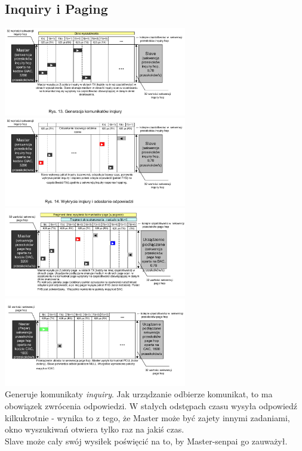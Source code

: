 \subsection{Inquiry i Paging}
\includegraphics[width=8cm]{./wyklady/Rysunek06.pdf}
\includegraphics[width=8cm]{./wyklady/Rysunek07.pdf}\\
\includegraphics[width=8cm]{./wyklady/Rysunek08.pdf}
\includegraphics[width=8cm]{./wyklady/Rysunek09.pdf}\\
Generuje komunikaty \emph{inquiry}.
Jak urządzanie odbierze komunikat, to ma obowiązek zwrócenia odpowiedzi. W stałych odstępach czasu wysyła odpowiedź kilkukrotnie - wynika to z tego, że Master może być zajety innymi zadaniami, okno wyszukiwań otwiera tylko raz na jakiś czas.\\
Slave może cały swój wysiłek poświęcić na to, by Master-senpai go zauważył. \\

